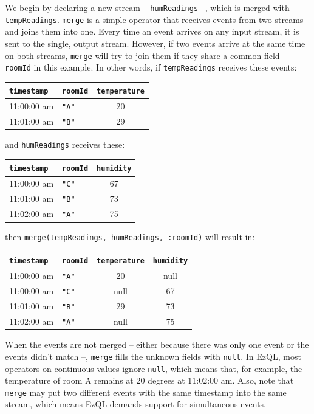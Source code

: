 We begin by declaring a new stream -- \verb=humReadings= --, which is
merged with \verb=tempReadings=. \verb=merge= is a simple operator
that receives events from two streams and joins them into one. Every
time an event arrives on any input stream, it is sent to the single,
output stream. However, if two events arrive at the same time on both
streams, \verb=merge= will try to join them if they share a common
field -- \verb=roomId= in this example. In other words, if
\verb=tempReadings= receives these events:

\begin{tabular}{ |l|l|c| }
  \hline
  \verb=timestamp= & \verb=roomId= & \verb=temperature= \\
  \hline
  11:00:00 am & \verb="A"= & 20 \\
  11:01:00 am & \verb="B"= & 29 \\
  \hline
\end{tabular}

and \verb=humReadings= receives these:

\begin{tabular}{ |l|l|c| }
  \hline
  \verb=timestamp= & \verb=roomId= & \verb=humidity= \\
  \hline
  11:00:00 am & \verb="C"= & 67 \\
  11:01:00 am & \verb="B"= & 73 \\
  11:02:00 am & \verb="A"= & 75 \\
  \hline
\end{tabular}

then \verb=merge(tempReadings, humReadings, :roomId)= will result in:

\begin{tabular}{ |l|l|c|c| }
  \hline
  \verb=timestamp= & \verb=roomId= & \verb=temperature= & \verb=humidity=\\
  \hline
  11:00:00 am & \verb="A"= & 20 & null \\
  11:00:00 am & \verb="C"= & null & 67 \\
  11:01:00 am & \verb="B"= & 29 & 73 \\
  11:02:00 am & \verb="A"= & null & 75 \\
  \hline
\end{tabular}

When the events are not merged -- either because there was only one
event or the events didn't match --, \verb=merge= fills the unknown
fields with \verb=null=. In EzQL, most operators on continuous values
ignore \verb=null=, which means that, for example, the temperature of
room A remains at 20 degrees at 11:02:00 am. Also, note that
\verb=merge= may put two different events with the same timestamp into
the same stream, which means EzQL demands support for simultaneous
events.


